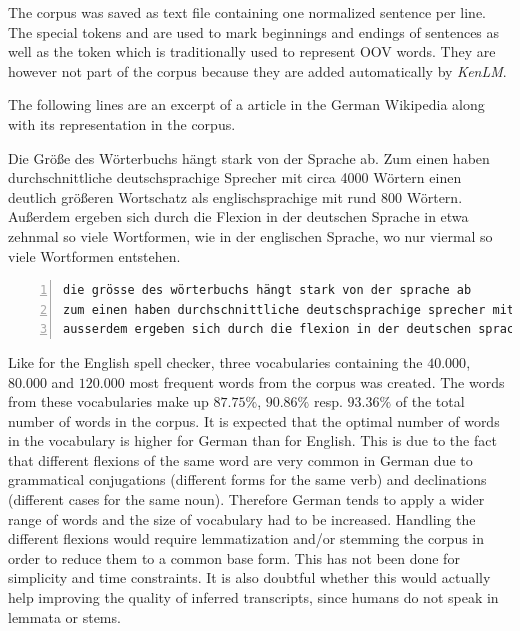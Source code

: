 The corpus was saved as text file containing one normalized sentence per line. The special tokens  and  are used to mark beginnings and endings of sentences as well as the  token which is traditionally used to represent \ac{OOV} words. They are however not part of the corpus because they are added automatically by \textit{KenLM}.

The following lines are an excerpt of a article in the German Wikipedia along with its representation in the corpus.

\begin{displayquote}
	Die Größe des Wörterbuchs hängt stark von der Sprache ab. Zum einen haben durchschnittliche deutschsprachige Sprecher mit circa 4000 Wörtern einen deutlich größeren Wortschatz als englischsprachige mit rund 800 Wörtern. Außerdem ergeben sich durch die Flexion in der deutschen Sprache in etwa zehnmal so viele Wortformen, wie in der englischen Sprache, wo nur viermal so viele Wortformen entstehen.
\end{displayquote}

\begin{lstlisting}[numbers=left, caption=Representation in corpus]
die grösse des wörterbuchs hängt stark von der sprache ab
zum einen haben durchschnittliche deutschsprachige sprecher mit circa <num> wörtern einen deutlich grösseren wortschatz als englischsprachige mit rund <num> wörtern
ausserdem ergeben sich durch die flexion in der deutschen sprache in etwa zehnmal so viele wortformen wie in der englischen sprache wo nur viermal so viele wortformen entstehen
\end{lstlisting}

Like for the English spell checker, three vocabularies containing the $40.000$, $80.000$ and $120.000$ most frequent words from the corpus was created. The words from these vocabularies make up $87.75\%$, $90.86\%$ resp. $93.36\%$ of the total number of words in the corpus. It is expected that the optimal number of words in the vocabulary is higher for German than for English. This is due to the fact that different flexions of the same word are very common in German due to grammatical conjugations (different forms for the same verb) and declinations (different cases for the same noun). Therefore German tends to apply a wider range of words and the size of vocabulary had to be increased. Handling the different flexions would require lemmatization and/or stemming the corpus in order to reduce them to a common base form. This has not been done for simplicity and time constraints. It is also doubtful whether this would actually help improving the quality of inferred transcripts, since humans do not speak in lemmata or stems.

